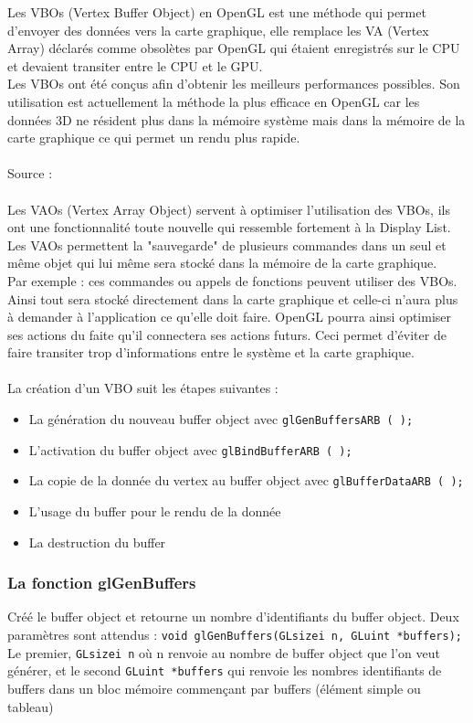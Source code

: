 
Les VBOs (Vertex Buffer Object) en OpenGL est une méthode qui permet d'envoyer des données vers la carte graphique, elle remplace les VA (Vertex Array) déclarés comme obsolètes par OpenGL qui étaient enregistrés sur le CPU et devaient transiter entre le CPU et le GPU.\\
Les VBOs ont été conçus afin d'obtenir les meilleurs performances possibles. Son utilisation est actuellement la méthode la plus efficace en OpenGL car les données 3D ne résident plus dans la mémoire système mais dans la mémoire de la carte graphique ce qui permet un rendu plus rapide.
\\\\
Source : \cite{VBO}
\\\\
Les VAOs (Vertex Array Object) servent à optimiser l'utilisation des VBOs, ils ont une fonctionnalité toute nouvelle qui ressemble fortement à la Display List. Les VAOs permettent la "sauvegarde" de plusieurs commandes dans un seul et même objet qui lui même sera stocké dans la mémoire de la carte graphique. \\
Par exemple : ces commandes ou appels de fonctions peuvent utiliser des VBOs. Ainsi tout sera stocké directement dans la carte graphique et celle-ci n'aura plus à demander à l'application ce qu'elle doit faire. OpenGL pourra ainsi optimiser ses actions du faite qu'il connectera ses actions futurs. Ceci permet d'éviter de faire transiter trop d'informations entre le système et la carte graphique.\\\\
La création d’un VBO suit les étapes suivantes : 
\begin{itemize}
\item La génération du nouveau buffer object avec \verb|glGenBuffersARB ( );|
\item L’activation du buffer object avec \verb|glBindBufferARB ( );|
\item La copie de la donnée du vertex au buffer object avec \verb|glBufferDataARB ( );| 
\item L’usage du buffer pour le rendu de la donnée
\item La destruction du buffer
\end{itemize}
\subsubsection*{La fonction glGenBuffers} 
Créé le buffer object et retourne un nombre d’identifiants du buffer object. Deux paramètres sont attendus : 
\verb|void glGenBuffers(GLsizei n, GLuint *buffers);|
\\
Le premier, \verb|GLsizei n| où n renvoie au nombre de buffer object que l’on veut générer, et le second \verb|GLuint *buffers| qui renvoie les nombres identifiants de buffers dans un bloc mémoire commençant par buffers (élément simple ou tableau)

